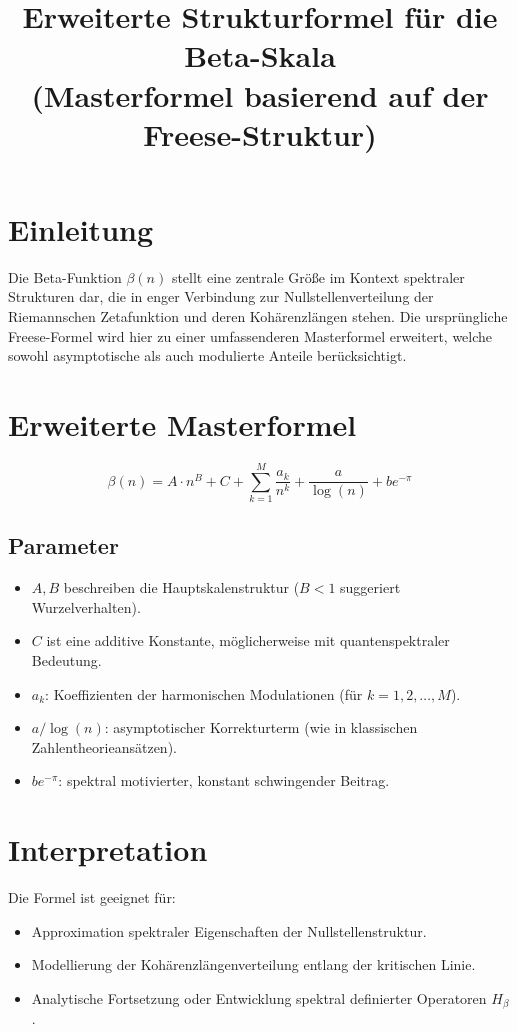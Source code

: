 \documentclass[a4paper,12pt]{article}
\title{Erweiterte Strukturformel für die Beta-Skala \\ \large (Masterformel basierend auf der Freese-Struktur)}
\author{}
\date{}
\begin{document}
\maketitle

\section*{Einleitung}
Die Beta-Funktion $\beta(n)$ stellt eine zentrale Größe im Kontext spektraler Strukturen dar, die in enger Verbindung zur Nullstellenverteilung der Riemannschen Zetafunktion und deren Kohärenzlängen stehen. Die ursprüngliche Freese-Formel wird hier zu einer umfassenderen Masterformel erweitert, welche sowohl asymptotische als auch modulierte Anteile berücksichtigt.

\section*{Erweiterte Masterformel}
\[
\beta(n) = A \cdot n^B + C + \sum_{k=1}^{M} \frac{a_k}{n^k} + \frac{a}{\log(n)} + b e^{-\pi}
\]

\subsection*{Parameter}
\begin{itemize}
    \item $A, B$ beschreiben die Hauptskalenstruktur ($B < 1$ suggeriert Wurzelverhalten).
    \item $C$ ist eine additive Konstante, möglicherweise mit quantenspektraler Bedeutung.
    \item $a_k$: Koeffizienten der harmonischen Modulationen (für $k = 1,2,\dots,M$).
    \item $a/\log(n)$: asymptotischer Korrekturterm (wie in klassischen Zahlentheorieansätzen).
    \item $b e^{-\pi}$: spektral motivierter, konstant schwingender Beitrag.
\end{itemize}

\section*{Interpretation}
Die Formel ist geeignet für:
\begin{itemize}
    \item Approximation spektraler Eigenschaften der Nullstellenstruktur.
    \item Modellierung der Kohärenzlängenverteilung entlang der kritischen Linie.
    \item Analytische Fortsetzung oder Entwicklung spektral definierter Operatoren $H_\beta$.
\end{itemize}
\end{document}
